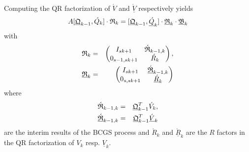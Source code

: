 \documentclass{scrartcl}
\numberwithin{equation}{section}
\begin{document}
Computing the QR factorization of $\acute{V}$ and $\underline{\acute{V}}$ respectively yields
\begin{equation*}
A [\underline{\frak{Q}}_{k - 1}, \acute{Q}_k] \cdot 
\frak{R}_k 
= [ \underline{\frak{Q}}_{k - 1}, \underline{\acute{Q}}_k ] \cdot 
\underline{\frak{R}}_k 
 \cdot
\underline{\frak{B}}_k
\end{equation*}
with
\begin{eqnarray*}
\frak{R}_k &=&
\begin{pmatrix}
	I_{sk + 1} & \acute{\frak{R}}_{k - 1, k}\\
	0_{s - 1, sk + 1} & \acute{R}_k\\
\end{pmatrix},\\
\underline{\frak{R}}_k &=&
\begin{pmatrix}
	I_{sk + 1} & \underline{\acute{\frak{R}}}_{k - 1, k}\\
	0_{s, sk + 1} & \underline{\acute{R}}_k\\
\end{pmatrix}
\end{eqnarray*}
where
\begin{eqnarray*}
	\frak{\acute{R}}_{k - 1, k} &=& \underline{\frak{Q}}_{k - 1}^T\acute{V}_k,\\
	\underline{\frak{\acute{R}}}_{k - 1, k} &=& \underline{\frak{Q}}_{k - 1}^T\underline{\acute{V}}_k
\end{eqnarray*}
are the interim results of the BCGS process and $\acute{R}_k$ and $\underline{\acute{R}}_k$ are the $R$ factors in the QR factorization of $V_k$ resp. $\underline{V}_k$.
\end{document}

